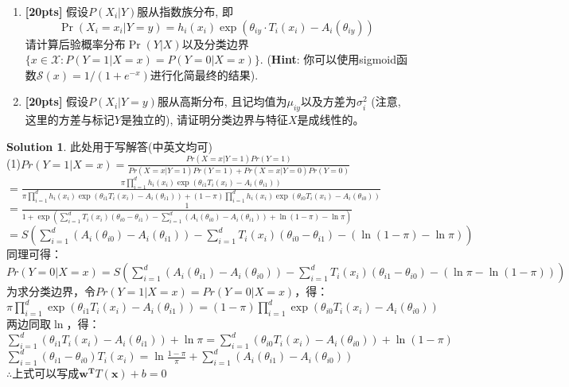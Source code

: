 \documentclass[a4paper,UTF8]{article}
\numberwithin{equation}{section}
\theoremstyle{definition}
\newtheorem*{solution}{Solution}
\begin{document}
\begin{enumerate}[(1)]
\item \textbf{[20pts]} 假设$P(X_i | Y)$服从指数族分布, 即
\[
\Pr(X_i = x_i | Y = y) = h_i(x_i) \exp (\theta_{iy} \cdot T_i(x_i) - A_{i}(\theta_{iy}))
\]
请计算后验概率分布$\Pr(Y | X)$以及分类边界$\{x \in \mathcal{X}: P(Y=1 | X = x) = P(Y=0 | X =x)\}$. (\textbf{Hint}: 你可以使用sigmoid函数$\mathcal{S}(x)=1/(1+e^{-x})$进行化简最终的结果).

\item \textbf{[20pts]} 假设$P(X_i | Y=y)$服从高斯分布, 且记均值为$\mu_{iy}$以及方差为$\sigma_{i}^2$ (注意, 这里的方差与标记$Y$是独立的), 请证明分类边界与特征$X$是成线性的。 
\end{enumerate}
\begin{solution}
此处用于写解答(中英文均可)\\
(1)$Pr(Y=1|X=x) = \frac{Pr(X=x|Y=1)Pr(Y=1)}{Pr(X=x|Y=1)Pr(Y=1) + Pr(X=x|Y=0)Pr(Y=0)}$\\
$= \frac{ \pi \prod_{i=1}^d  h_i(x_i)\exp(\theta_{i1}T_i(x_i)-A_i(\theta_{i1})) }{\pi \prod_{i=1}^d  h_i(x_i)\exp(\theta_{i1}T_i(x_i)-A_i(\theta_{i1})) +  (1-\pi)\prod_{i=1}^d  h_i(x_i)\exp(\theta_{i0}T_i(x_i)-A_i(\theta_{i0})) }$\\
$= \frac{1}{ 1+\exp( \sum_{i=1}^dT_i(x_i)(\theta_{i0}-\theta_{i1})-\sum_{i=1}^d( A_i(\theta_{i0})-A_i(\theta_{i1}) ) + \ln(1-\pi) - \ln\pi ) }$\\
$= S(\sum_{i=1}^d( A_i(\theta_{i0})-A_i(\theta_{i1}) ) - \sum_{i=1}^dT_i(x_i)(\theta_{i0}-\theta_{i1}) - (\ln(1-\pi) - \ln\pi))$\\
同理可得：\\
$Pr(Y=0|X=x) = S(\sum_{i=1}^d( A_i(\theta_{i1})-A_i(\theta_{i0}) ) - \sum_{i=1}^dT_i(x_i)(\theta_{i1}-\theta_{i0}) - (\ln\pi - \ln(1-\pi) ))$\\
为求分类边界，令$Pr(Y=1|X=x) = Pr(Y=0|X=x)$，得：\\
$\pi\prod_{i=1}^d \exp(\theta_{i1}T_i(x_i)-A_i(\theta_{i1})) = (1-\pi)\prod_{i=1}^d \exp(\theta_{i0}T_i(x_i)-A_i(\theta_{i0}))$\\
两边同取$\ln$，得：\\
$\sum_{i=1}^d ( \theta_{i1}T_i(x_i)-A_i(\theta_{i1}) ) + \ln\pi = \sum_{i=1}^d ( \theta_{i0}T_i(x_i)-A_i(\theta_{i0}) ) + \ln(1-\pi)$\\
$\sum_{i=1}^d ( \theta_{i1}-\theta_{i0} )T_i(x_i) = \ln \frac{1-\pi}{\pi} + \sum_{i=1}^d ( A_i(\theta_{i1})-A_i(\theta_{i0}) )$\\
$\therefore$上式可以写成$\mathbf{w^T}T(\mathbf{x}) + b = 0$\\

\end{solution}
\end{document}

